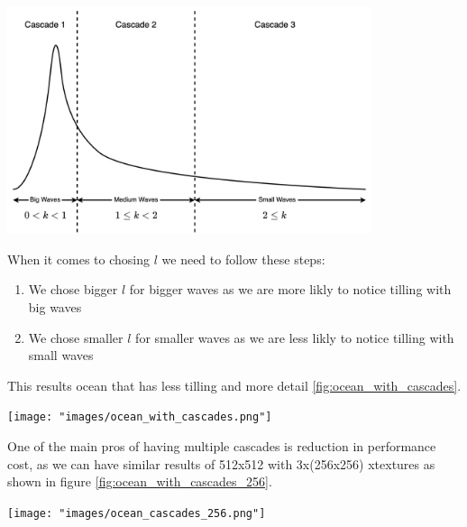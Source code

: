 \begin{minipage}{1\textwidth}
    \centering
    \includegraphics[width=0.8\textwidth]{"images/cascades.png"}
    \label{fig:cascades}
\end{minipage}
When it comes to chosing $l$ we need to follow these steps:
\begin{enumerate}
    \item We chose bigger $l$ for bigger waves as we are more likly to notice tilling with big waves
    \item We chose smaller $l$ for smaller waves as we are less likly to notice tilling with small waves
\end{enumerate}
This results ocean that has less tilling and more detail \ref{fig:ocean_with_cascades}.

\begin{minipage}{1\textwidth}
    \centering
    \texttt{[image: "images/ocean\_with\_cascades.png"]}
    \label{fig:ocean_with_cascades}
\end{minipage}

One of the main pros of having multiple cascades is reduction in performance cost, as we can have similar results of 512x512 with 3x(256x256) xtextures as shown in figure \ref{fig:ocean_with_cascades_256}.

\begin{minipage}{1\textwidth}
    \centering
    \texttt{[image: "images/ocean\_cascades\_256.png"]}
    \label{fig:ocean_with_cascades_256}
\end{minipage}


